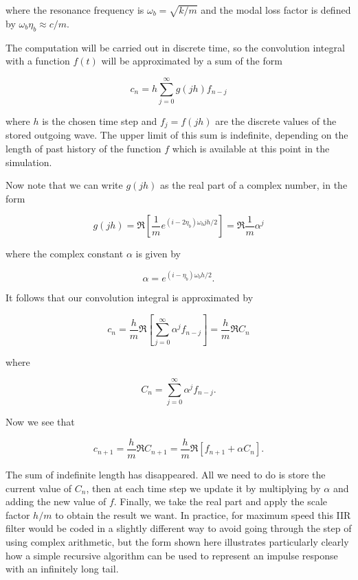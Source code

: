   \noindent{}where the resonance frequency is $\omega_b = \sqrt{k/m}$ and the 
  modal loss factor is defined by $\omega_b \eta_b \approx c/m$. 

  The computation will be carried out in discrete time, so the convolution 
  integral with a function $f(t)$ will be approximated by a sum of the form 

  \begin{equation*}c_n=h\sum_{j=0}^{\infty}{g(jh) f_{n-j}} 
  \tag{2}\end{equation*} 

  \noindent{}where $h$ is the chosen time step and $f_j=f(jh)$ are the discrete 
  values of the stored outgoing wave. The upper limit of this sum is 
  indefinite, depending on the length of past history of the function $f$ which 
  is available at this point in the simulation. 

  Now note that we can write $g(jh)$ as the real part of a complex number, in 
  the form 

  \begin{equation*}g(jh) = \Re{\left[ \dfrac{1}{m} e^{(i-2\eta_b)\omega_b jh/2} 
  \right]} = \Re{\dfrac{1}{m} \alpha^j} \tag{3}\end{equation*} 

  \noindent{}where the complex constant $\alpha$ is given by 

  \begin{equation*}\alpha=e^{(i- \eta_b)\omega_b h/2} . \tag{4}\end{equation*} 

  It follows that our convolution integral is approximated by 

  \begin{equation*}c_n=\dfrac{h}{m}\Re{\left[\sum_{j=0}^{\infty}{\alpha^j 
  f_{n-j}} \right]}=\dfrac{h}{m}\Re{C_n} \tag{5}\end{equation*} 

  \noindent{}where 

  \begin{equation*}C_n=\sum_{j=0}^{\infty}{\alpha^j f_{n-j}}. 
  \tag{6}\end{equation*} 

  Now we see that 

  \begin{equation*}c_{n+1}=\dfrac{h}{m}\Re{C_{n+1}}=\dfrac{h}{m} 
  \Re{\left[f_{n+1}+\alpha C_{n} \right]} . \tag{7}\end{equation*} 

  The sum of indefinite length has disappeared. All we need to do is store the 
  current value of $C_n$, then at each time step we update it by multiplying by 
  $\alpha$ and adding the new value of $f$. Finally, we take the real part and 
  apply the scale factor $h/m$ to obtain the result we want. In practice, for 
  maximum speed this IIR filter would be coded in a slightly different way to 
  avoid going through the step of using complex arithmetic, but the form shown 
  here illustrates particularly clearly how a simple recursive algorithm can be 
  used to represent an impulse response with an infinitely long tail. 

